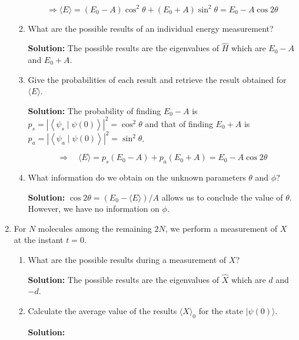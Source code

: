 \documentclass{article}
\begin{document}
\begin{enumerate}
\begin{enumerate}
{        $$
        \Longrightarrow \langle E \rangle = \left(E_{0} - A\right) \cos ^{2} \theta + \left(E_{0} + A\right) \sin ^{2} \theta = E_{0} - A \cos 2 \theta
        $$}

        \item What are the possible results of an individual energy measurement?

        {\color{red}\textbf{Solution:} The possible results are the eigenvalues of $\hat{H}$ which are $E_{0} - A$ and $E_{0} + A$.}

        \item Give the probabilities of each result and retrieve the result obtained for $\langle E \rangle$.

        {\color{red}\textbf{Solution:} The probability of finding $E_{0} - A$ is $p_{s} = \left|\left\langle\psi_{s} \mid \psi(0)\right\rangle\right|^{2} = \cos ^{2} \theta$ and that of finding $E_{0} + A$ is $p_{a} = \left|\left\langle\psi_{a} \mid \psi(0)\right\rangle\right|^{2} = \sin ^{2} \theta$.

        $$
        \Longrightarrow \quad \langle E \rangle = p_{s}\left(E_{0} - A\right) + p_{a}\left(E_{0} + A\right) = E_{0} - A \cos 2 \theta
        $$}

        \item What information do we obtain on the unknown parameters $\theta$ and $\phi$?

        {\color{red}\textbf{Solution:} $\cos 2 \theta = \left(E_{0} - \langle E \rangle\right) / A$ allows us to conclude the value of $\theta$. However, we have no information on $\phi$.}

    \end{enumerate}

    \item For $N$ molecules among the remaining $2N$, we perform a measurement of $X$ at the instant $t=0$.

    \begin{enumerate}
        \item What are the possible results during a measurement of $X$?

        {\color{red}\textbf{Solution:} The possible results are the eigenvalues of $\hat{X}$ which are $d$ and $-d$.}

        \item Calculate the average value of the results $\langle X \rangle_{0}$ for the state $|\psi(0)\rangle$.

        {\color{red}\textbf{Solution:}

}
\end{enumerate}
\end{enumerate}
\end{document}
